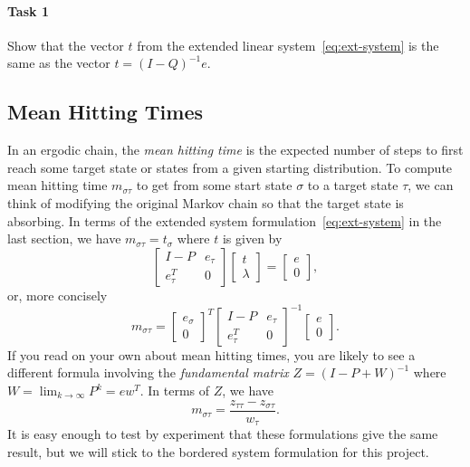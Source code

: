 \documentclass[12pt, leqno]{article}
\begin{document}
\paragraph*{Task 1}
Show that the vector $t$ from the extended linear
system~\eqref{eq:ext-system} is the same as the vector
$t = (I-Q)^{-1} e$.

\subsection*{Mean Hitting Times}

In an ergodic chain, the {\em mean hitting time} is the expected
number of steps to first reach some target state or states from a
given starting distribution.  To compute mean hitting time $m_{\sigma
  \tau}$ to get from some start state $\sigma$ to a target state
$\tau$, we can think of modifying the original Markov chain so that
the target state is absorbing.  In terms of the extended system
formulation~\eqref{eq:ext-system} in the last section, we have
$m_{\sigma \tau} = t_{\sigma}$ where $t$ is given by
\[
\begin{bmatrix}
  I-P & e_{\tau} \\
  e_{\tau}^T & 0
\end{bmatrix}
\begin{bmatrix}
  t \\ \lambda
\end{bmatrix} =
\begin{bmatrix}
  e \\ 0
\end{bmatrix},
\]
or, more concisely
\[
  m_{\sigma \tau} =
  \begin{bmatrix} e_\sigma \\ 0 \end{bmatrix}^T
  \begin{bmatrix} I-P & e_{\tau} \\ e_{\tau}^T & 0 \end{bmatrix}^{-1}
  \begin{bmatrix} e \\ 0 \end{bmatrix}.
\]
If you read on your own about mean hitting times, you are likely to
see a different formula involving
the {\em fundamental matrix} $Z = (I-P+W)^{-1}$ where
$W = \lim_{k\rightarrow \infty} P^k = ew^T$.  In terms of $Z$, we have
\[
  m_{\sigma \tau} = \frac{z_{\tau \tau} - z_{\sigma \tau}}{w_\tau}.
\]
It is easy enough to test by experiment that these formulations give
the same result, but we will stick to the bordered system formulation
for this project.
\end{document}
